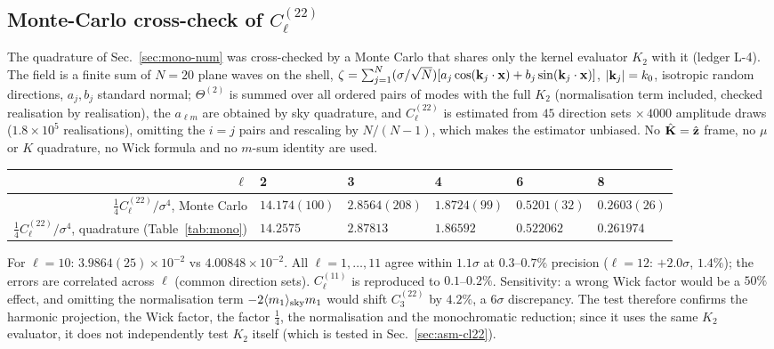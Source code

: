 \subsection{Monte-Carlo cross-check of \texorpdfstring{$C^{(22)}_\ell$}{C22}}
\label{sec:mono-mc}
The quadrature of Sec.~\ref{sec:mono-num} was cross-checked by a Monte Carlo that shares only the kernel evaluator $K_2$ with it
(ledger L-4).  The field is a finite sum of $N=20$ plane waves on the shell, $\zeta=\sum_{j=1}^{N}(\sigma/\sqrt N)[a_j\cos(\mathbf k_j\cdot\mathbf x)+b_j\sin(\mathbf k_j\cdot\mathbf x)]$,
$|\mathbf k_j|=k_0$, isotropic random directions, $a_j,b_j$ standard normal; $\Theta^{(2)}$ is summed over all ordered pairs of modes with the
full $K_2$ (normalisation term included, checked realisation by realisation), the $a_{\ell m}$ are obtained by sky quadrature, and
$C^{(22)}_\ell$ is estimated from $45$ direction sets $\times\,4000$ amplitude draws ($1.8\times10^5$ realisations), omitting the
$i=j$ pairs and rescaling by $N/(N-1)$, which makes the estimator unbiased.  No $\hat{\mathbf K}=\hat{\mathbf z}$ frame, no $\mu$ or $K$ quadrature, no
Wick formula and no $m$-sum identity are used.
\begin{center}\footnotesize
\begin{tabular}{r|lllll}
\hline
$\ell$ & 2 & 3 & 4 & 6 & 8\\ \hline
$\tfrac14C^{(22)}_\ell/\sigma^4$, Monte Carlo & $14.174(100)$ & $2.8564(208)$ & $1.8724(99)$ & $0.5201(32)$ & $0.2603(26)$\\
$\tfrac14C^{(22)}_\ell/\sigma^4$, quadrature (Table~\ref{tab:mono}) & $14.2575$ & $2.87813$ & $1.86592$ & $0.522062$ & $0.261974$\\ \hline
\end{tabular}
\end{center}
For $\ell=10$: $3.9864(25)\times10^{-2}$ vs $4.00848\times10^{-2}$.  All $\ell=1,\dots,11$ agree within $1.1\sigma$ at $0.3$--$0.7\%$ precision
($\ell=12$: $+2.0\sigma$, $1.4\%$); the errors are correlated across $\ell$ (common direction sets).  $C^{(11)}_\ell$ is reproduced to
$0.1$--$0.2\%$.  Sensitivity: a wrong Wick factor would be a $50\%$ effect, and omitting the normalisation term $-2\langle m_1\rangle_{\rm sky}m_1$ would shift
$C^{(22)}_3$ by $4.2\%$, a $6\sigma$ discrepancy.  The test therefore confirms the harmonic projection, the Wick factor, the factor $\tfrac14$,
the normalisation and the monochromatic reduction; since it uses the same $K_2$ evaluator, it does not independently test $K_2$ itself
(which is tested in Sec.~\ref{sec:asm-cl22}).
